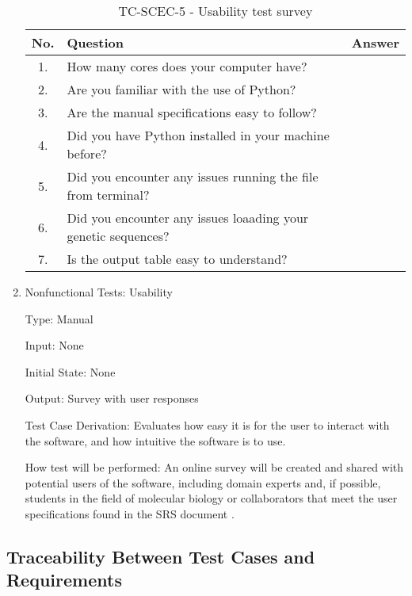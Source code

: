 \documentclass[12pt, titlepage]{article}
\begin{document}
\begin{enumerate}

\begin{table}[h]
  \centering
  \begin{tabular}{|c|p{11cm}|c|}
      \hline
      No. & Question & Answer \\
      \hline
      1. & How many cores does your computer have? & \\
      \hline
      2. & Are you familiar with the use of Python? & \\
      \hline
      3. & Are the manual specifications easy to follow? & \\
      \hline
      4. & Did you have Python installed in your machine before? & \\
      \hline
      5. & Did you encounter any issues running the file from terminal? & \\
      \hline
      6. & Did you encounter any issues loaading your genetic sequences? & \\
      \hline
      7. & Is the output table easy to understand? & \\
      \hline
  \end{tabular}
  \caption{TC-SCEC-5 - Usability test survey}
  \label{tab:usability-survey}
\end{table}

\item{Nonfunctional Tests: Usability}

Type: Manual

Input: None

Initial State: None 

Output: Survey with user responses

Test Case Derivation: Evaluates how easy it is for the user to interact with the software, and how intuitive the software is to use.

How test will be performed: An online survey will be created and shared with potential users of the software, 
including domain experts and, if possible, students in the field of molecular biology or collaborators that meet the 
user specifications found in the SRS document \citet{SRS}.
\end{enumerate}
  


\newpage
\subsection{Traceability Between Test Cases and Requirements}
\end{document}
